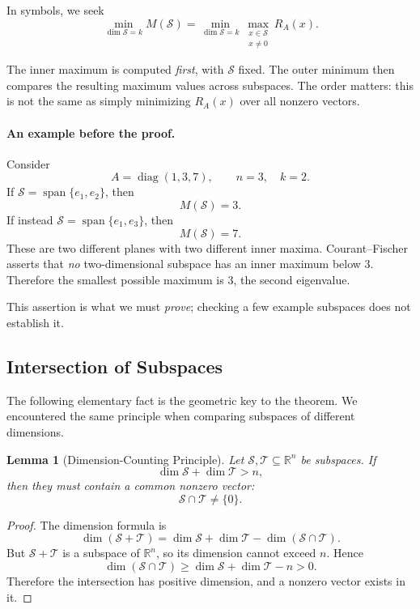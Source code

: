 \documentclass[14pt,letterpaper]{article}
\theoremstyle{plain}
\newtheorem{lemma}[theorem]{Lemma}
\theoremstyle{definition}
\theoremstyle{remark}
\newcommand{\R}{\mathbb{R}}
\DeclareMathOperator{\diag}{diag}
\DeclareMathOperator{\Span}{span}
\begin{document}
In symbols, we seek
\[
\boxed{
\min_{\dim\mathcal S=k}M(\mathcal S)
=\min_{\dim\mathcal S=k}
\max_{\substack{x\in\mathcal S\\x\neq0}}R_A(x).
}
\]

The inner maximum is computed \emph{first}, with
$\mathcal S$ fixed. The outer minimum then compares
the resulting maximum values across subspaces.
The order matters: this is not the same as simply
minimizing $R_A(x)$ over all nonzero vectors.

\paragraph{An example before the proof.}
Consider
\[
A=\diag(1,3,7),\qquad n=3,\quad k=2.
\]
If $\mathcal S=\Span\{e_1,e_2\}$, then
\[
M(\mathcal S)=3.
\]
If instead $\mathcal S=\Span\{e_1,e_3\}$, then
\[
M(\mathcal S)=7.
\]
These are two different planes with two different
inner maxima. Courant--Fischer asserts that \emph{no}
two-dimensional subspace has an inner maximum below
$3$. Therefore the smallest possible maximum is $3$,
the second eigenvalue.

This assertion is what we must \emph{prove}; checking
a few example subspaces does not establish it.

\subsection{Intersection of Subspaces}
\label{subsec:courant_dimension}

The following elementary fact is the geometric key to
the theorem. We encountered the same principle when
comparing subspaces of different dimensions.

\begin{lemma}[Dimension-Counting Principle]
\label{lem:courant_dimension}
Let $\mathcal S,\mathcal T\subseteq\R^n$ be subspaces.
If
\[
\dim\mathcal S+\dim\mathcal T>n,
\]
then they must contain a common nonzero vector:
\[
\boxed{\mathcal S\cap\mathcal T\neq\{0\}.}
\]
\end{lemma}

\begin{proof}
The dimension formula is
\[
\dim(\mathcal S+\mathcal T)
=\dim\mathcal S+\dim\mathcal T
-\dim(\mathcal S\cap\mathcal T).
\]
But $\mathcal S+\mathcal T$ is a subspace of $\R^n$,
so its dimension cannot exceed $n$. Hence
\[
\dim(\mathcal S\cap\mathcal T)
\geq\dim\mathcal S+\dim\mathcal T-n>0.
\]
Therefore the intersection has positive dimension,
and a nonzero vector exists in it.
\end{proof}
\end{document}
